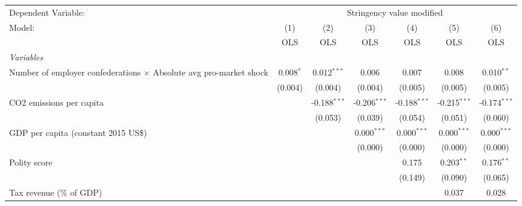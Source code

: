 
\begingroup
\centering
\begin{tabular}{lcccccc}
   \toprule
   Dependent Variable: & \multicolumn{6}{c}{Stringency value modified}\\
   Model:                                                                    & (1)         & (2)            & (3)            & (4)            & (5)            & (6)\\  
                                                                             &  OLS        & OLS            & OLS            & OLS            & OLS            & OLS\\  
   \midrule
   \emph{Variables}\\
   Number of employer confederations $\times$ Absolute avg pro-market shock  & 0.008$^{*}$ & 0.012$^{***}$  & 0.006          & 0.007          & 0.008          & 0.010$^{**}$\\   
                                                                             & (0.004)     & (0.004)        & (0.004)        & (0.005)        & (0.005)        & (0.005)\\   
   CO2 emissions per capita                                                  &             & -0.188$^{***}$ & -0.206$^{***}$ & -0.188$^{***}$ & -0.215$^{***}$ & -0.174$^{***}$\\   
                                                                             &             & (0.053)        & (0.039)        & (0.054)        & (0.051)        & (0.060)\\   
   GDP per capita (constant 2015 US\$)                                       &             &                & 0.000$^{***}$  & 0.000$^{***}$  & 0.000$^{***}$  & 0.000$^{***}$\\   
                                                                             &             &                & (0.000)        & (0.000)        & (0.000)        & (0.000)\\   
   Polity score                                                              &             &                &                & 0.175          & 0.203$^{**}$   & 0.176$^{**}$\\   
                                                                             &             &                &                & (0.149)        & (0.090)        & (0.065)\\   
   Tax revenue (\% of GDP)                                                   &             &                &                &                & 0.037          & 0.028\\   

\end{tabular}
